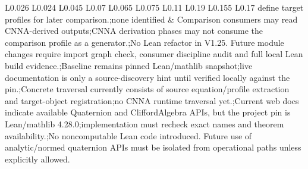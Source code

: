\begin{longtable}{L{0.026\linewidth} L{0.024\linewidth} L{0.045\linewidth} L{0.07\linewidth} L{0.065\linewidth} L{0.075\linewidth} L{0.11\linewidth} L{0.19\linewidth} L{0.155\linewidth} L{0.17\linewidth}}
define target profiles for later comparison.;\newline none identified & Comparison consumers may read CNNA-derived outputs;\newline CNNA derivation phases may not consume the comparison profile as a generator.;\newline No Lean refactor in V1.25. Future module changes require import graph check, consumer discipline audit and full local Lean build evidence.;\newline Baseline remains pinned Lean/\allowbreak{}mathlib snapshot;\newline live documentation is only a source-discovery hint until verified locally against the pin.;\newline Concrete traversal currently consists of source equation/\allowbreak{}profile extraction and target-object registration;\newline no CNNA runtime traversal yet.;\newline Current web docs indicate available Quaternion and CliffordAlgebra APIs, but the project pin is Lean/\allowbreak{}mathlib 4.28.0;\newline implementation must recheck exact names and theorem availability.;\newline No noncomputable Lean code introduced. Future use of analytic/\allowbreak{}normed quaternion APIs must be isolated from operational paths unless explicitly allowed.\\
\hline
\addlinespace[0.24em]

\end{longtable}
